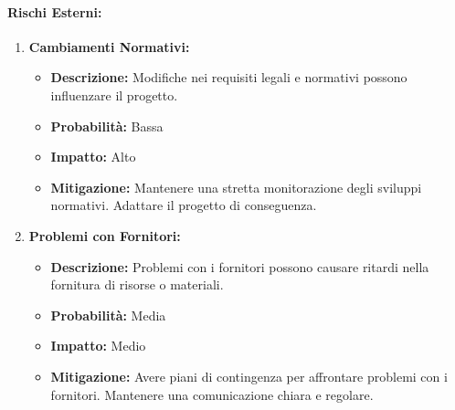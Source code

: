 \paragraph{Rischi Esterni:}

\begin{enumerate}
    \item \textbf{Cambiamenti Normativi:}
          \begin{itemize}
              \item \textbf{Descrizione:} Modifiche nei requisiti legali e normativi possono influenzare il progetto.
              \item \textbf{Probabilità:} Bassa
              \item \textbf{Impatto:} Alto
              \item \textbf{Mitigazione:} Mantenere una stretta monitorazione degli sviluppi normativi. Adattare il progetto di conseguenza.
          \end{itemize}

    \item \textbf{Problemi con Fornitori:}
          \begin{itemize}
              \item \textbf{Descrizione:} Problemi con i fornitori possono causare ritardi nella fornitura di risorse o materiali.
              \item \textbf{Probabilità:} Media
              \item \textbf{Impatto:} Medio
              \item \textbf{Mitigazione:} Avere piani di contingenza per affrontare problemi con i fornitori. Mantenere una comunicazione chiara e regolare.
          \end{itemize}
\end{enumerate}